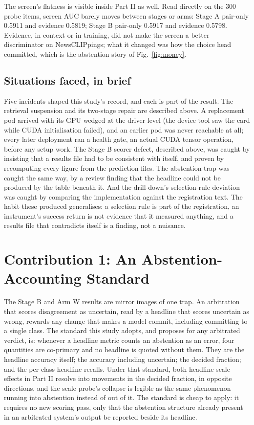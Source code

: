 \documentclass[conference]{IEEEtran}
\begin{document}
The screen's flatness is visible inside Part II as well. Read directly on the 300 probe items, screen AUC barely moves between stages or arms: Stage A pair-only 0.5911 and evidence 0.5819; Stage B pair-only 0.5917 and evidence 0.5798. Evidence, in context or in training, did not make the screen a better discriminator on NewsCLIPpings; what it changed was how the choice head committed, which is the abstention story of Fig.~\ref{fig:money}.

\subsection{Situations faced, in brief}

Five incidents shaped this study's record, and each is part of the result. The retrieval suspension and its two-stage repair are described above. A replacement pod arrived with its GPU wedged at the driver level (the device tool saw the card while CUDA initialisation failed), and an earlier pod was never reachable at all; every later deployment ran a health gate, an actual CUDA tensor operation, before any setup work. The Stage B scorer defect, described above, was caught by insisting that a results file had to be consistent with itself, and proven by recomputing every figure from the prediction files. The abstention trap was caught the same way, by a review finding that the headline could not be produced by the table beneath it. And the drill-down's selection-rule deviation was caught by comparing the implementation against the registration text. The habit these produced generalises: a selection rule is part of the registration, an instrument's success return is not evidence that it measured anything, and a results file that contradicts itself is a finding, not a nuisance.

\section{Contribution 1: An Abstention-Accounting Standard}
\label{sec:abstention}

The Stage B and Arm W results are mirror images of one trap. An arbitration that scores disagreement as uncertain, read by a headline that scores uncertain as wrong, rewards any change that makes a model commit, including committing to a single class. The standard this study adopts, and proposes for any arbitrated verdict, is: whenever a headline metric counts an abstention as an error, four quantities are co-primary and no headline is quoted without them. They are the headline accuracy itself; the accuracy including uncertain; the decided fraction; and the per-class headline recalls. Under that standard, both headline-scale effects in Part II resolve into movements in the decided fraction, in opposite directions, and the scale probe's collapse is legible as the same phenomenon running into abstention instead of out of it. The standard is cheap to apply: it requires no new scoring pass, only that the abstention structure already present in an arbitrated system's output be reported beside its headline.
\end{document}
